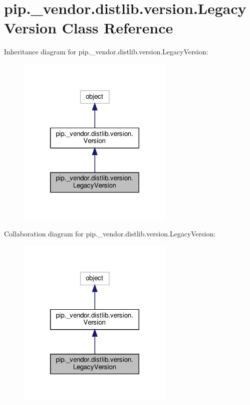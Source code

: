 \hypertarget{classpip_1_1__vendor_1_1distlib_1_1version_1_1LegacyVersion}{}\section{pip.\+\_\+vendor.\+distlib.\+version.\+Legacy\+Version Class Reference}
\label{classpip_1_1__vendor_1_1distlib_1_1version_1_1LegacyVersion}


Inheritance diagram for pip.\+\_\+vendor.\+distlib.\+version.\+Legacy\+Version\+:
\nopagebreak
\begin{figure}[H]
\begin{center}
\leavevmode
\includegraphics[width=213pt]{classpip_1_1__vendor_1_1distlib_1_1version_1_1LegacyVersion__inherit__graph}
\end{center}
\end{figure}


Collaboration diagram for pip.\+\_\+vendor.\+distlib.\+version.\+Legacy\+Version\+:
\nopagebreak
\begin{figure}[H]
\begin{center}
\leavevmode
\includegraphics[width=213pt]{classpip_1_1__vendor_1_1distlib_1_1version_1_1LegacyVersion__coll__graph}
\end{center}
\end{figure}
